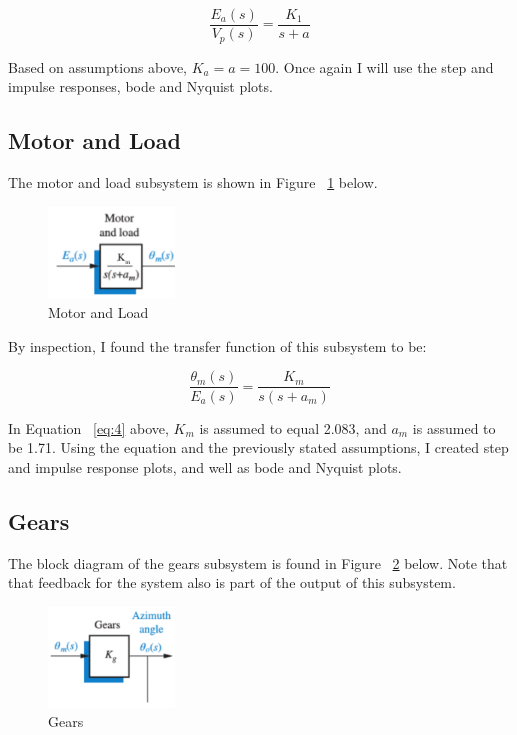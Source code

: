 \documentclass[12pt]{article}
\begin{document}
\begin{equation}
\frac{E_{a}(s)}{V_{p}(s)} = \frac{K_{1}}{s+a}\label{eq:3}
\end{equation}

Based on assumptions above, $K_{a} = a = 100$. Once again I will use the step and impulse responses, bode and Nyquist plots.


\subsection{Motor and Load}

The motor and load subsystem is shown in Figure ~\ref{fig:motor} below.

\begin{figure}[H]
\begin{center}
	\includegraphics[width=0.3\textwidth]{./img/MotorBlock.png}
	\caption{\label{fig:motor}Motor and Load}
\end{center}
\end{figure}

By inspection, I found the transfer function of this subsystem to be:

\begin{equation}
\frac{\theta_{m}(s)}{E_{a}(s)} = \frac{K_{m}}{s(s+a_{m})}\label{eq:4}
\end{equation}

In Equation ~\ref{eq:4} above, $K_{m}$ is assumed to equal 2.083, and $a_{m}$ is assumed to be 1.71. Using the equation and the previously stated assumptions, I created step and impulse response plots, and well as bode and Nyquist plots.


\subsection{Gears}

The block diagram of the gears subsystem is found in Figure ~\ref{fig:gears} below. Note that that feedback for the system also is part of the output of this subsystem.

\begin{figure}[H]
\begin{center}
	\includegraphics[width=0.3\textwidth]{./img/GearsBlock.png}
	\caption{\label{fig:gears}Gears}
\end{center}
\end{figure}
\end{document}
